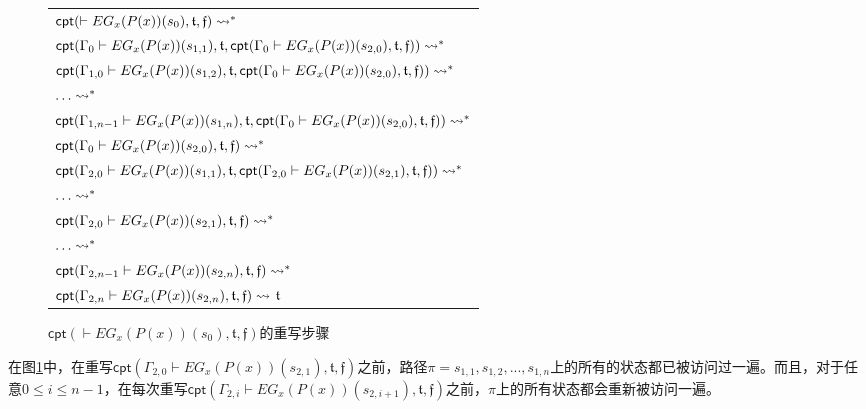 \begin{example}
\begin{figure}[h!]
			\begin{tabular}{|l|}
				\hline
				$
				\textsf{cpt}(\vdash EG_x(P(x))(s_0),\mathfrak{t},\mathfrak{f}) \rightsquigarrow^*$\\
				$\textsf{cpt}(\Gamma_{0}\vdash EG_x(P(x))(s_{1,1}),\mathfrak{t},\textsf{cpt}(\Gamma_{0}\vdash EG_x(P(x))(s_{2,0}), \mathfrak{t},\mathfrak{f}))\rightsquigarrow^*
				$\\
				$\textsf{cpt}(\Gamma_{1,0}\vdash EG_x(P(x))(s_{1,2}),\mathfrak{t},\textsf{cpt}(\Gamma_{0}\vdash EG_x(P(x))(s_{2,0}), \mathfrak{t},\mathfrak{f}))\rightsquigarrow^*
				$\\
				$\ldots\rightsquigarrow^*$\\
				$\textsf{cpt}(\Gamma_{1,n-1}\vdash EG_x(P(x))(s_{1,n}),\mathfrak{t},\textsf{cpt}(\Gamma_{0}\vdash EG_x(P(x))(s_{2,0}), \mathfrak{t},\mathfrak{f}))\rightsquigarrow^*$\\
				$\textsf{cpt}(\Gamma_{0}\vdash EG_x(P(x))(s_{2,0}), \mathfrak{t},\mathfrak{f})\rightsquigarrow^*$\\
				$\textsf{cpt}(\Gamma_{2,0}\vdash EG_x(P(x))(s_{1,1}), \mathfrak{t},\textsf{cpt}(\Gamma_{2,0}\vdash EG_x(P(x))(s_{2,1}), \mathfrak{t},\mathfrak{f}))\rightsquigarrow^*$\\
				$\ldots\rightsquigarrow^*$\\
				$\textsf{cpt}(\Gamma_{2,0}\vdash EG_x(P(x))(s_{2,1}), \mathfrak{t},\mathfrak{f})\rightsquigarrow^*$\\
				$\ldots\rightsquigarrow^*$\\
				$\textsf{cpt}(\Gamma_{2,n-1}\vdash EG_x(P(x))(s_{2,n}), \mathfrak{t},\mathfrak{f})\rightsquigarrow^*$\\
				$\textsf{cpt}(\Gamma_{2,n}\vdash EG_x(P(x))(s_{2,n}), \mathfrak{t},\mathfrak{f})\rightsquigarrow$
				$\mathfrak{t}$\\
				\hline
			\end{tabular}
			\caption{$\textsf{cpt}(\vdash EG_x(P(x))(s_0),\mathfrak{t},\mathfrak{f})$的重写步骤}
			\label{example:globalmerge:fig}
		\end{figure}
		
		在图\ref{example:globalmerge:fig}中，在重写$\textsf{cpt}(\Gamma_{2,0}\vdash EG_x(P(x))(s_{2,1}), \mathfrak{t},\mathfrak{f})$之前，路径$\pi = s_{1,1},s_{1,2},...,s_{1,n}$上的所有的状态都已被访问过一遍。而且，对于任意$0\le i\le n-1$，在每次重写$\textsf{cpt}(\Gamma_{2,i}\vdash EG_x(P(x))(s_{2,i+1}), \mathfrak{t},\mathfrak{f})$之前，$\pi$上的所有状态都会重新被访问一遍。
		

\end{example}
